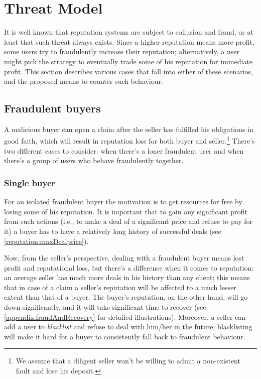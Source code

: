 \documentclass[11pt]{article}
\begin{document}
\section{Threat Model} \label{threatModel}

It is well known \cite{ciccarelli2011collusion, maranzato2010fraud} that reputation systems are subject to collusion and fraud, or at least that such threat always exists. Since a higher reputation means more profit, some users try to fraudulently increase their reputation; alternatively, a user might 
pick the strategy to eventually trade some of his reputation for immediate profit. This section describes various cases that fall into either of these scenarios, and the proposed means to counter such behaviour.

\subsection{Fraudulent buyers} \label{threatModel:buyers}

A malicious buyer can open a claim after the seller has fulfilled his obligations in good faith, which will result in reputation loss for both buyer and seller.\footnote{We assume that a diligent seller won't be willing to admit a non-existent fault and lose his deposit.} There's two different cases to consider: when there's a loner fraudulent user and when there's a group of users who behave fraudulently together.

\subsubsection{Single buyer} \label{threatModel:buyers:single}

For an isolated fraudulent buyer the motivation is to get resources for free by losing some of his reputation. It is important that to gain any significant profit from such actions (i.e., to make a deal of a significant price and refuse to pay for it) a buyer has to have a relatively long history of successful deals (see \ref{reputation:maxDealprice}).


Now, from the seller's perspective, dealing with a fraudulent buyer means lost profit and reputational loss, but there's a difference when it comes to reputation: an average seller has much more deals in his history than any client; this means that in case of a claim a seller's reputation will be affected to a much lesser extent than that of a buyer. The buyer's reputation, on the other hand, will go down significantly, and it will take significant time to recover (see \ref{appendix:fraudAndRecovery} for detailed illustrations). Moreover, a seller can add a user to \textit{blacklist} and refuse to deal with him/her in the future; blacklisting will make it hard for a buyer to consistently fall back to fraudulent behaviour. 
\end{document}
